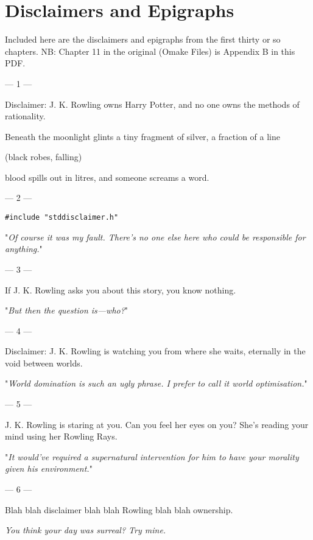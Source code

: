 \chapter{Disclaimers and Epigraphs}

Included here are the disclaimers and epigraphs from the first thirty or so
chapters. NB: Chapter 11 in the original (Omake Files) is Appendix B in this PDF.

\sbreak
{ %
\setlength{\parindent}{0pt}
\setlength{\parskip}{1em}

\filbreak
--- 1 ---

Disclaimer: J. K. Rowling owns Harry Potter, and no one owns the methods of rationality.

\begin{em}
Beneath the moonlight glints a tiny fragment of silver, a fraction of a line{\el}

(black robes, falling)

{\el}blood spills out in litres, and someone screams a word.
\end{em}

\filbreak
--- 2 ---

\texttt{\#include "stddisclaimer.h"}

"\emph{Of course it was my fault. There's no one else here who could be 
responsible for anything.}"

\filbreak
--- 3 ---

If J. K. Rowling asks you about this story, you know nothing.

"\emph{But then the question is---who?}"

\filbreak
--- 4 ---

Disclaimer: J. K.
Rowling is watching you from where she waits, eternally in the void between
worlds.

"\emph{World domination is such an ugly phrase. I prefer to call it world
optimisation.}"

\filbreak
--- 5 ---

J. K. Rowling is
staring at you. Can you feel her eyes on you? She's reading your mind using her
Rowling Rays.

"\emph{It would've required a \emph{supernatural intervention} for him to have
\emph{your} morality given \emph{his} environment.}"

\filbreak
--- 6 ---

Blah blah
disclaimer blah blah Rowling blah blah ownership.

\emph{You think your day was surreal? Try mine.}

}
